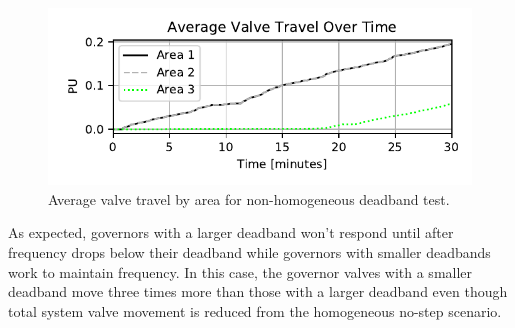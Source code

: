\begin{figure}[!ht]
\centering
\includegraphics[width=\linewidth]{figures/miniWECCuniAccVTOverTime}
\caption{Average valve travel by area for non-homogeneous deadband test.}
\label{fig: areaValveTravel}
\end{figure}

As expected, governors with a larger deadband won't respond until after frequency drops below their deadband while governors with smaller deadbands work to maintain frequency. 
In this case, the governor valves with a smaller deadband move three times more than those with a larger deadband even though total system valve movement is reduced from the homogeneous no-step scenario.

